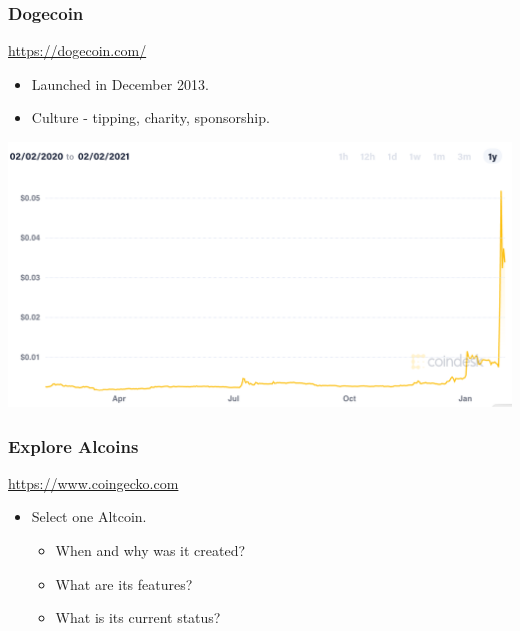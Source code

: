\documentclass{beamer}
\begin{document}
\begin{frame}
  \frametitle{Dogecoin}
  \url{https://dogecoin.com/}
\begin{itemize}
	\item Launched in December 2013.
	\item Culture - tipping, charity, sponsorship.
\end{itemize}
 	\centering
	\includegraphics[scale=0.35]{dogecoin}
\end{frame}
\begin{frame}
  \frametitle{Explore Alcoins}
  \url{https://www.coingecko.com}
\begin{itemize}
	\item Select one Altcoin.
	\pause
	\begin{itemize}
		\item When and why was it created?
		\item What are its features?
		\item What is its current status?
	\end{itemize}
\end{itemize}
\end{frame}

\end{document}

